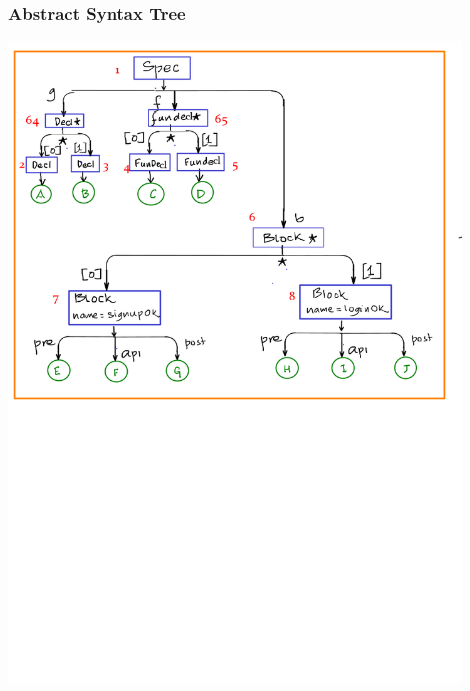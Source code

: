 \documentclass[12pts, a4paper]{article}
\begin{document}
\subsubsection{Abstract Syntax Tree}
\begin{center}
\includegraphics[width=0.9\textwidth]{images/spec-AST-2.png}

\end{center}
\end{document}
